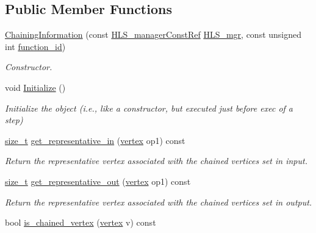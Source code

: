 \subsection*{Public Member Functions}
\begin{DoxyCompactItemize}
\item 
\hyperlink{classChainingInformation_a7fe5b29f1d89fdf1218e973dbc6c3e2b}{Chaining\+Information} (const \hyperlink{hls__manager_8hpp_a1b481383e3beabc89bd7562ae672dd8c}{H\+L\+S\+\_\+manager\+Const\+Ref} \hyperlink{classChainingInformation_a47af998080762385042e518b2605a5da}{H\+L\+S\+\_\+mgr}, const unsigned int \hyperlink{classChainingInformation_af6b3dc65f580c0e11c3e7ec52ab9f852}{function\+\_\+id})
\begin{DoxyCompactList}\small\item\em Constructor. \end{DoxyCompactList}\item 
void \hyperlink{classChainingInformation_a932253df325db11aea294c1d53f16950}{Initialize} ()
\begin{DoxyCompactList}\small\item\em Initialize the object (i.\+e., like a constructor, but executed just before exec of a step) \end{DoxyCompactList}\item 
\hyperlink{tutorial__fpt__2017_2intro_2sixth_2test_8c_a7c94ea6f8948649f8d181ae55911eeaf}{size\+\_\+t} \hyperlink{classChainingInformation_af6ba20747c1f89b2c18a28b85e63fb4e}{get\+\_\+representative\+\_\+in} (\hyperlink{graph_8hpp_abefdcf0544e601805af44eca032cca14}{vertex} op1) const
\begin{DoxyCompactList}\small\item\em Return the representative vertex associated with the chained vertices set in input. \end{DoxyCompactList}\item 
\hyperlink{tutorial__fpt__2017_2intro_2sixth_2test_8c_a7c94ea6f8948649f8d181ae55911eeaf}{size\+\_\+t} \hyperlink{classChainingInformation_a55e0881a35f46688a9475fc746daf66c}{get\+\_\+representative\+\_\+out} (\hyperlink{graph_8hpp_abefdcf0544e601805af44eca032cca14}{vertex} op1) const
\begin{DoxyCompactList}\small\item\em Return the representative vertex associated with the chained vertices set in output. \end{DoxyCompactList}\item 
bool \hyperlink{classChainingInformation_a1c54e6712525921dfbf1761db84e0bf2}{is\+\_\+chained\+\_\+vertex} (\hyperlink{graph_8hpp_abefdcf0544e601805af44eca032cca14}{vertex} v) const

\end{DoxyCompactItemize}
